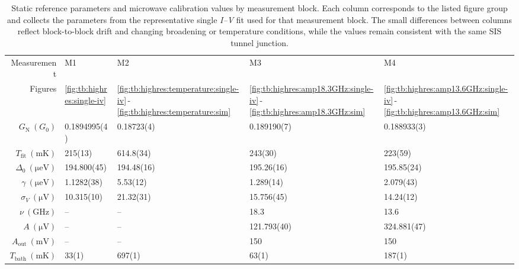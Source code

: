     \begin{table}
        \centering
        \footnotesize
        \caption{Static reference parameters and microwave calibration values by measurement block. Each column corresponds to the listed figure group and collects the parameters from the representative single \textit{I--V} fit used for that measurement block. The small differences between columns reflect block-to-block drift and changing broadening or temperature conditions, while the values remain consistent with the same SIS tunnel junction.}
        \vspace{1em}
        \begin{tabular}{r|l|l|l|l}
            Measurement & M1 & M2 & M3 & M4 \\
            Figures & \ref{fig:tb:highres:single-iv} & \ref{fig:tb:highres:temperature:single-iv}\,-\,\ref{fig:tb:highres:temperature:sim} & \ref{fig:tb:highres:amp18.3GHz:single-iv}\,-\,\ref{fig:tb:highres:amp18.3GHz:sim} & \ref{fig:tb:highres:amp13.6GHz:single-iv}\,-\,\ref{fig:tb:highres:amp13.6GHz:sim} \\\hline
            $G_\mathrm{N}\ (G_0)$ & 0.1894995(4) & 0.18723(4) & 0.189190(7) & 0.188933(3) \\
            $T_\mathrm{fit}\ (\unit{\milli\kelvin})$ & 215(13) & 614.8(34) & 243(30) & 223(59) \\
            $\Delta_0\ (\unit{\micro\electronvolt})$ & 194.800(45) & 194.48(16) & 195.26(16) & 195.85(24) \\
            $\gamma\ (\unit{\micro\electronvolt})$ & 1.1282(38) & 5.53(12) & 1.289(14) & 2.079(43) \\
            $\sigma_V\ (\unit{\micro\volt})$ & 10.315(10) & 21.32(31) & 15.756(45) & 14.24(12) \\
            $\nu\ (\unit{\giga\hertz})$ & -- & -- & 18.3 & 13.6 \\
            $A\ (\unit{\micro\volt})$ & -- & -- & 121.793(40) & 324.881(47) \\
            $A_\mathrm{out}\ (\unit{\milli\volt})$ & -- & -- & 150 & 150 \\
            $T_\mathrm{bath}\ (\unit{\milli\kelvin})$ & 33(1) & 697(1) & 63(1) & 187(1)
        \end{tabular}
        \label{table:tunnelbarrier:highres}
    \end{table}
    
